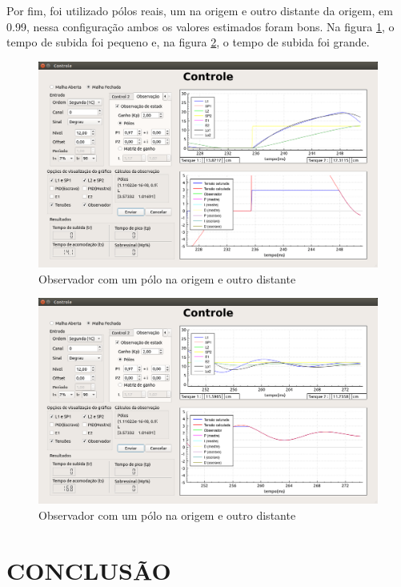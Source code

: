 \documentclass[a4paper,12pt]{article}
\begin{document}
\newpage
\hspace{4ex}Por fim, foi utilizado pólos reais, um na origem e outro distante da origem, em 0.99, nessa configuração ambos os valores estimados foram bons. Na figura \ref{img7}, o tempo de subida foi pequeno e, na figura \ref{img8}, o tempo de subida foi grande.
\begin{figure}[!h]
\centering
\includegraphics[width=13cm]{FotosObservador/PoloRapidoELento2}
\caption{Observador com um pólo na origem e outro distante}
\label{img7}
\end{figure}
\begin{figure}[!h]
\centering
\includegraphics[width=13cm]{FotosObservador/PoloRapidoELento1}
\caption{Observador com um pólo na origem e outro distante}
\label{img8}
\end{figure}

\newpage


\thispagestyle{main}

\section{CONCLUSÃO}
\end{document}
